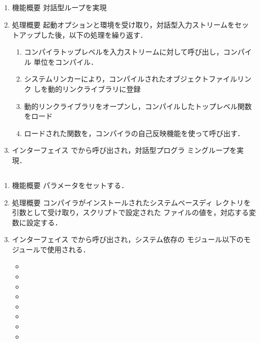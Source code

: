 \subsection{}
\begin{enumerate}
\item 機能概要 対話型ループを実現
\item 処理概要 起動オプションと環境を受け取り，対話型入力ストリームをセッ
トアップした後，以下の処理を繰り返す．
\begin{enumerate}
\item コンパイラトップレベルを入力ストリームに対して呼び出し，コンパイル
単位をコンパイル．
\item システムリンカーにより，コンパイルされたオブジェクトファイルリンク
しを動的リンクライブラリに登録
\item 動的リンクライブラリをオープンし，コンパイルしたトップレベル関数
をロード
\item ロードされた関数を，コンパイラの自己反映機能を使って呼び出す．
\end{enumerate}
\item インターフェイス でから呼び出され，対話型プログラ
ミングループを実現．
\end{enumerate}

\subsection{}
\begin{enumerate}
\item 機能概要 パラメータをセットする．
\item 処理概要 \smlsharp{}コンパイラがインストールされたシステムベースディ
レクトリを引数として受け取り，スクリプトで設定された
ファイルの値を，対応する変数に設定する．
\item インターフェイス でから呼び出され，システム依存の
モジュール以下のモジュールで使用される．
\begin{itemize}
\item {}
\item {}
\item {}
\item {}
\item {}
\item {}
\item {}
\item {}
\end{itemize}
\end{enumerate}

